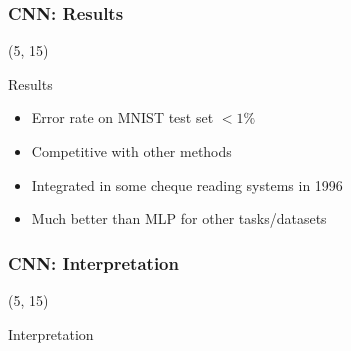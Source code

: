 \begin{frame}
  \frametitle{\acl{CNN}: Results}

  \begin{textblock}{90}(5, 15)
    \begin{block}{Results}
      \begin{itemize}
      \item Error rate on MNIST test set $< 1\%$
      \item<2-> Competitive with other methods
      \item<3-> Integrated in some cheque reading systems in 1996
      \item<4-> Much better than \ac{MLP} for other tasks/datasets
      \end{itemize}
    \end{block}
  \end{textblock}

\end{frame}


\begin{frame}
  \frametitle{\acl{CNN}: Interpretation}

  \begin{textblock}{90}(5, 15)
    \begin{block}{Interpretation}
      \end{block}
  \end{textblock}

\end{frame}


